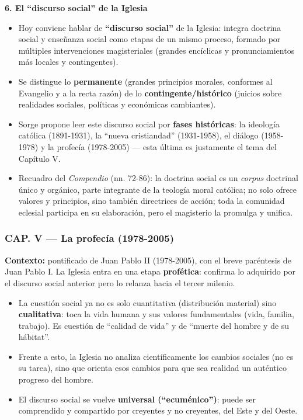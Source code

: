 \documentclass[10pt,a4paper]{article}
\begin{document}
\medskip\noindent \textbf{6. El ``discurso social'' de la Iglesia}\par\nopagebreak
\begin{itemize}
\item Hoy conviene hablar de \textbf{``discurso social''} de la Iglesia: integra doctrina social y enseñanza social como etapas de un mismo proceso, formado por múltiples intervenciones magisteriales (grandes encíclicas y pronunciamientos más locales y contingentes).
\item Se distingue lo \textbf{permanente} (grandes principios morales, conformes al Evangelio y a la recta razón) de lo \textbf{contingente/histórico} (juicios sobre realidades sociales, políticas y económicas cambiantes).
\item Sorge propone leer este discurso social por \textbf{fases históricas}: la ideología católica (1891-1931), la ``nueva cristiandad'' (1931-1958), el diálogo (1958-1978) y la profecía (1978-2005) --- esta última es justamente el tema del Capítulo V.
\item Recuadro del \textit{Compendio} (nn. 72-86): la doctrina social es un \textit{corpus} doctrinal único y orgánico, parte integrante de la teología moral católica; no solo ofrece valores y principios, sino también directrices de acción; toda la comunidad eclesial participa en su elaboración, pero el magisterio la promulga y unifica.
\end{itemize}



\subsubsection{CAP. V --- La profecía (1978-2005)}

\noindent \textbf{Contexto:} pontificado de Juan Pablo II (1978-2005), con el breve paréntesis de Juan Pablo I. La Iglesia entra en una etapa \textbf{profética}: confirma lo adquirido por el discurso social anterior pero lo relanza hacia el tercer milenio.\par\smallskip

\begin{itemize}
\item La cuestión social ya no es solo cuantitativa (distribución material) sino \textbf{cualitativa}: toca la vida humana y sus valores fundamentales (vida, familia, trabajo). Es cuestión de ``calidad de vida'' y de ``muerte del hombre y de su hábitat''.
\item Frente a esto, la Iglesia no analiza científicamente los cambios sociales (no es su tarea), sino que orienta esos cambios para que sea realidad un auténtico progreso del hombre.
\item El discurso social se vuelve \textbf{universal (``ecuménico'')}: puede ser comprendido y compartido por creyentes y no creyentes, del Este y del Oeste.
\end{itemize}
\end{document}
